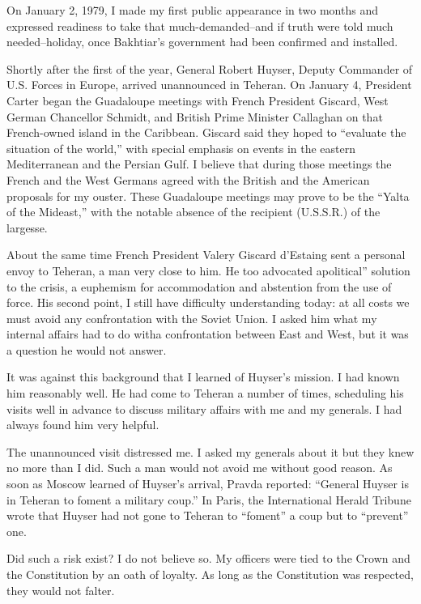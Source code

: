 On January 2, 1979, I made my first public appearance in two months and expressed readiness to take that much-demanded--and if truth were told much needed--holiday, once Bakhtiar’s government had been confirmed and installed. 

Shortly after the first of the year, General Robert Huyser, Deputy Commander of U.S. Forces in Europe, arrived unannounced in Teheran. On January 4, President Carter began the Guadaloupe meetings with French President Giscard, West German Chancellor Schmidt, and British Prime Minister Callaghan on that French-owned island in the Caribbean. Giscard said they hoped to “evaluate the situation of the world,” with special emphasis on events in the eastern Mediterranean and the Persian Gulf. I believe that during those meetings the French and the West Germans agreed with the British and the American proposals for my ouster. These Guadaloupe meetings may prove to be the “Yalta of the Mideast,” with the notable absence of the recipient (U.S.S.R.) of the largesse. 


About the same time French President Valery Giscard d'Estaing sent a personal envoy to Teheran, a man very close to him. He too advocated apolitical” solution to the crisis, a euphemism for accommodation and abstention from the use of force. His second point, I still have difficulty understanding today: at all costs we must avoid any confrontation with the Soviet Union. I asked him what my internal affairs had to do witha confrontation between East and West, but it was a question he would not answer. 

It was against this background that I learned of Huyser’s mission. I had known him reasonably well. He had come to Teheran a number of times, scheduling his visits well in advance to discuss military affairs with me and my generals. I had always found him very helpful. 

The unannounced visit distressed me. I asked my generals about it but they knew no more than I did. Such a man would not avoid me without good reason. As soon as Moscow learned of Huyser’s arrival, Pravda reported: “General Huyser is in Teheran to foment a military coup.” In Paris, the International Herald Tribune wrote that Huyser had not gone to Teheran to “foment” a coup but to “prevent” one. 

Did such a risk exist? I do not believe so. My officers were tied to the Crown and the Constitution by an oath of loyalty. As long as the Constitution was respected, they would not falter. 

